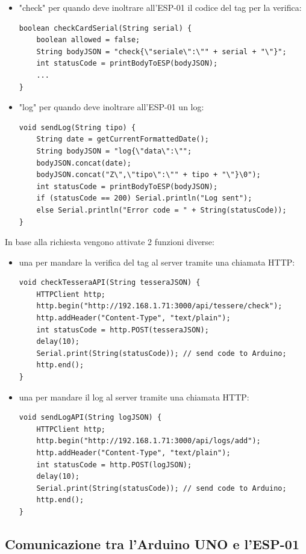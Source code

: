 \documentclass[12pt]{report}
\begin{document}
\begin{itemize}
	\item "check" per quando deve inoltrare all'ESP-01 il codice del tag per la verifica:
\begin{lstlisting}
boolean checkCardSerial(String serial) {
	boolean allowed = false;
	String bodyJSON = "check{\"seriale\":\"" + serial + "\"}";
	int statusCode = printBodyToESP(bodyJSON);
	...
}
\end{lstlisting}
	\item "log" per quando deve inoltrare all'ESP-01 un log:
\begin{lstlisting}
void sendLog(String tipo) {
	String date = getCurrentFormattedDate();
	String bodyJSON = "log{\"data\":\"";
	bodyJSON.concat(date);
	bodyJSON.concat("Z\",\"tipo\":\"" + tipo + "\"}\0");
	int statusCode = printBodyToESP(bodyJSON);
	if (statusCode == 200) Serial.println("Log sent");
	else Serial.println("Error code = " + String(statusCode));
}
\end{lstlisting}
\end{itemize}
In base alla richiesta vengono attivate 2 funzioni diverse:
\begin{itemize}
	\item una per mandare la verifica del tag al server tramite una chiamata HTTP:
\begin{lstlisting}
void checkTesseraAPI(String tesseraJSON) {
	HTTPClient http;
	http.begin("http://192.168.1.71:3000/api/tessere/check");
	http.addHeader("Content-Type", "text/plain");
	int statusCode = http.POST(tesseraJSON);
	delay(10);
	Serial.print(String(statusCode)); // send code to Arduino;
	http.end();
}
\end{lstlisting}
	\item una per mandare il log al server tramite una chiamata HTTP: 
\begin{lstlisting}
void sendLogAPI(String logJSON) {
	HTTPClient http;
	http.begin("http://192.168.1.71:3000/api/logs/add");
	http.addHeader("Content-Type", "text/plain");
	int statusCode = http.POST(logJSON);
	delay(10);
	Serial.print(String(statusCode)); // send code to Arduino;
	http.end();
}
\end{lstlisting}
\end{itemize}

\subsection{Comunicazione tra l'Arduino UNO e l'ESP-01 }
\end{document}
